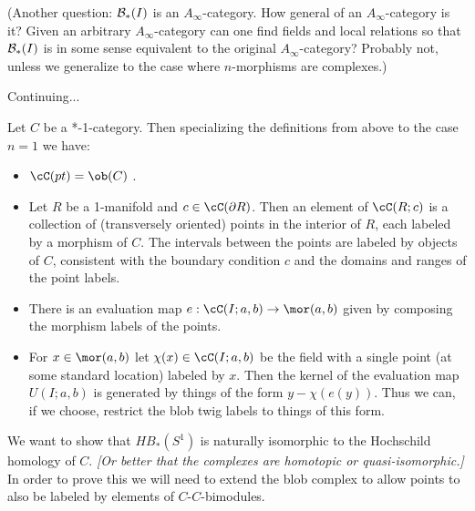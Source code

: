 \documentclass[11pt,leqno]{article}
\def\bc{{\cal B}}
\def\bd{\partial}
\def\nn#1{{{\it \small [#1]}}}
\begin{document}
(Another question: $\bc_*(I)$ is an $A_\infty$-category.
How general of an $A_\infty$-category is it?
Given an arbitrary $A_\infty$-category can one find fields and local relations so
that $\bc_*(I)$ is in some sense equivalent to the original $A_\infty$-category?
Probably not, unless we generalize to the case where $n$-morphisms are complexes.)

Continuing...

Let $C$ be a *-1-category.
Then specializing the definitions from above to the case $n=1$ we have:
\begin{itemize}
\item $\cC(pt) = \ob(C)$ .
\item Let $R$ be a 1-manifold and $c \in \cC(\bd R)$.
Then an element of $\cC(R; c)$ is a collection of (transversely oriented) 
points in the interior
of $R$, each labeled by a morphism of $C$.
The intervals between the points are labeled by objects of $C$, consistent with
the boundary condition $c$ and the domains and ranges of the point labels.
\item There is an evaluation map $e: \cC(I; a, b) \to \mor(a, b)$ given by
composing the morphism labels of the points.
\item For $x \in \mor(a, b)$ let $\chi(x) \in \cC(I; a, b)$ be the field with a single
point (at some standard location) labeled by $x$.
Then the kernel of the evaluation map $U(I; a, b)$ is generated by things of the 
form $y - \chi(e(y))$.
Thus we can, if we choose, restrict the blob twig labels to things of this form.
\end{itemize}

We want to show that $HB_*(S^1)$ is naturally isomorphic to the 
Hochschild homology of $C$.
\nn{Or better that the complexes are homotopic
or quasi-isomorphic.}
In order to prove this we will need to extend the blob complex to allow points to also
be labeled by elements of $C$-$C$-bimodules.
\end{document}
